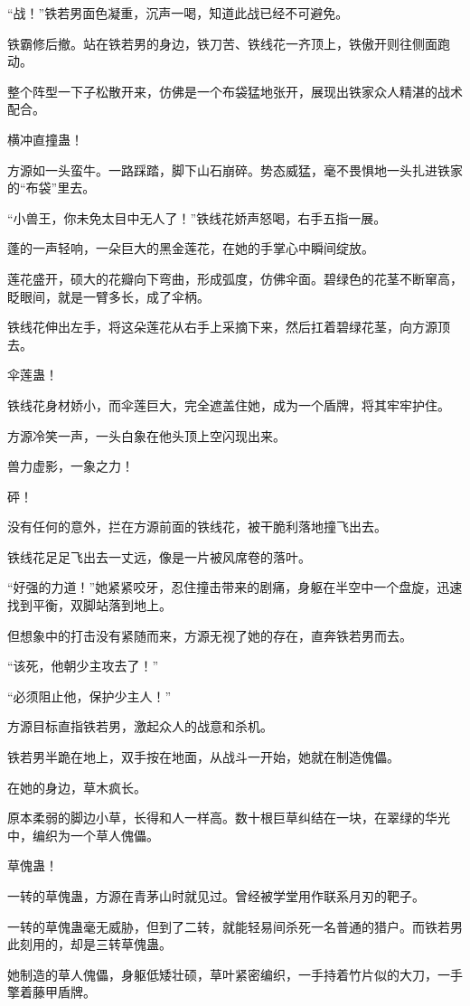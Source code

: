 \begin{this_body}
“战！”铁若男面色凝重，沉声一喝，知道此战已经不可避免。

铁霸修后撤。站在铁若男的身边，铁刀苦、铁线花一齐顶上，铁傲开则往侧面跑动。

整个阵型一下子松散开来，仿佛是一个布袋猛地张开，展现出铁家众人精湛的战术配合。

横冲直撞蛊！

方源如一头蛮牛。一路踩踏，脚下山石崩碎。势态威猛，毫不畏惧地一头扎进铁家的“布袋”里去。

“小兽王，你未免太目中无人了！”铁线花娇声怒喝，右手五指一展。

蓬的一声轻响，一朵巨大的黑金莲花，在她的手掌心中瞬间绽放。

莲花盛开，硕大的花瓣向下弯曲，形成弧度，仿佛伞面。碧绿色的花茎不断窜高，眨眼间，就是一臂多长，成了伞柄。

铁线花伸出左手，将这朵莲花从右手上采摘下来，然后扛着碧绿花茎，向方源顶去。

伞莲蛊！

铁线花身材娇小，而伞莲巨大，完全遮盖住她，成为一个盾牌，将其牢牢护住。

方源冷笑一声，一头白象在他头顶上空闪现出来。

兽力虚影，一象之力！

砰！

没有任何的意外，拦在方源前面的铁线花，被干脆利落地撞飞出去。

铁线花足足飞出去一丈远，像是一片被风席卷的落叶。

“好强的力道！”她紧紧咬牙，忍住撞击带来的剧痛，身躯在半空中一个盘旋，迅速找到平衡，双脚站落到地上。

但想象中的打击没有紧随而来，方源无视了她的存在，直奔铁若男而去。

“该死，他朝少主攻去了！”

“必须阻止他，保护少主人！”

方源目标直指铁若男，激起众人的战意和杀机。

铁若男半跪在地上，双手按在地面，从战斗一开始，她就在制造傀儡。

在她的身边，草木疯长。

原本柔弱的脚边小草，长得和人一样高。数十根巨草纠结在一块，在翠绿的华光中，编织为一个草人傀儡。

草傀蛊！

一转的草傀蛊，方源在青茅山时就见过。曾经被学堂用作联系月刃的靶子。

一转的草傀蛊毫无威胁，但到了二转，就能轻易间杀死一名普通的猎户。而铁若男此刻用的，却是三转草傀蛊。

她制造的草人傀儡，身躯低矮壮硕，草叶紧密编织，一手持着竹片似的大刀，一手擎着藤甲盾牌。


\end{this_body}
